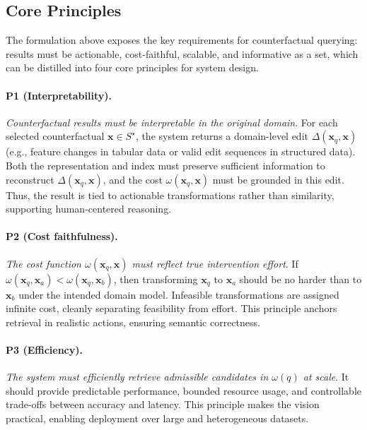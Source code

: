 \subsection{Core Principles}\label{sec:core_principles}

The formulation above exposes the key requirements for counterfactual querying: results must be actionable, cost-faithful, scalable, and informative as a set, which can be distilled into four core principles for system design.

\paragraph{\textbf{P1 (Interpretability).}} 
\emph{Counterfactual results must be interpretable in the original domain}. For each selected counterfactual $\mathbf{x} \in S^\star$, the system returns a domain-level edit $\Delta(\mathbf{x}_q,\mathbf{x})$ (e.g., feature changes in tabular data or valid edit sequences in structured data). Both the representation and index must preserve sufficient information to reconstruct $\Delta(\mathbf{x}_q,\mathbf{x})$, and the cost $\omega(\mathbf{x}_q,\mathbf{x})$ must be grounded in this edit. Thus, the result is tied to actionable transformations rather than similarity, supporting human-centered reasoning.

\paragraph{\textbf{P2 (Cost faithfulness).}} 
\emph{The cost function $\omega(\mathbf{x}_q,\mathbf{x})$ must reflect true intervention effort}. If $\omega(\mathbf{x}_q,\mathbf{x}_a) < \omega(\mathbf{x}_q,\mathbf{x}_b)$, then transforming $\mathbf{x}_q$ to $\mathbf{x}_a$ should be no harder than to $\mathbf{x}_b$ under the intended domain model. Infeasible transformations are assigned infinite cost, cleanly separating feasibility from effort. This principle anchors retrieval in realistic actions, ensuring semantic correctness.

\paragraph{\textbf{P3 (Efficiency).}} 
\emph{The system must efficiently retrieve admissible candidates in $\mathcal \omega(q)$ at scale}. It should provide predictable performance, bounded resource usage, and controllable trade-offs between accuracy and latency. This principle makes the vision practical, enabling deployment over large and heterogeneous datasets.

